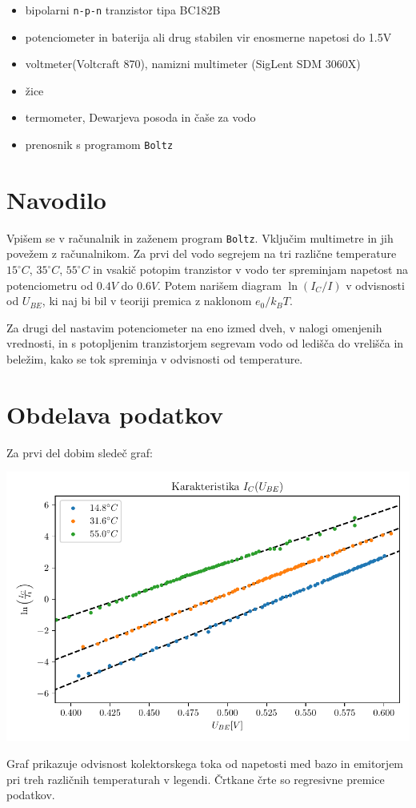 \documentclass[12pt]{report}
\begin{document}
\begin{itemize}
  \item bipolarni \verb+n-p-n+ tranzistor tipa BC182B
  \item potenciometer in baterija ali drug stabilen vir enosmerne napetosi do 1.5V
  \item voltmeter(Voltcraft 870), namizni multimeter (SigLent SDM 3060X)
  \item žice
  \item termometer, Dewarjeva posoda in čaše za vodo 
  \item prenosnik s programom \verb+Boltz+ 
\end{itemize}

\chapter*{Navodilo}

Vpišem se v računalnik in zaženem program \verb+Boltz+. Vključim multimetre in jih povežem z računalnikom. Za prvi del vodo segrejem na tri različne temperature $15 ^\circ C$, $35 ^\circ C$, $55 ^\circ C$ in vsakič potopim tranzistor v vodo ter spreminjam napetost na potenciometru od $0.4V$ do $0.6V$. Potem narišem diagram $\ln (I_C/ I)$ v odvisnosti od $U_{BE}$, ki naj bi bil v teoriji premica z naklonom $e_0/k_B T$. 

Za drugi del nastavim potenciometer na eno izmed dveh, v nalogi omenjenih vrednosti, in s potopljenim tranzistorjem segrevam vodo od ledišča do vrelišča in beležim, kako se tok spreminja v odvisnosti od temperature. 

\endgroup


\chapter*{Obdelava podatkov}

Za prvi del dobim sledeč graf: 

\begin{slika}
  \centering
  \includegraphics{1graf}
  \caption{\small Graf prikazuje odvisnost kolektorskega toka od napetosti med bazo in emitorjem pri treh različnih temperaturah v legendi. Črtkane črte so regresivne premice podatkov.}
\end{slika}
\end{document}
